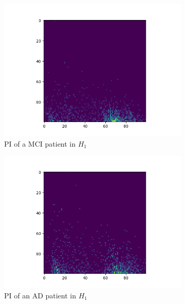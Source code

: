 \documentclass{article}
\begin{document}
\begin{figure}
\begin{subfigure}{0.32\textwidth}
    \includegraphics[width=\textwidth]{figures/PIs/Persistence_image_MCI_h_1.png}
    \caption{PI of a MCI patient in $H_1$}
  \end{subfigure}
  \begin{subfigure}{0.32\textwidth}
    \includegraphics[width=\textwidth]{figures/PIs/Persistence_image_AD_h_1.png}
    \caption{PI of an AD patient in $H_1$}
  \end{subfigure}
  \begin{subfigure}{0.32\textwidth}

\end{subfigure}
\end{figure}
\end{document}

